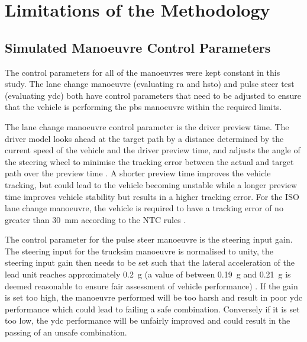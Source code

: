 \section{Limitations of the Methodology}\label{section:discussion-methodology-limitations}

\subsection{Simulated Manoeuvre Control Parameters}\label{section:discussion-limitations-control-parameters}

The control parameters for all of the manoeuvres were kept constant in this study. The lane change manoeuvre (evaluating \gls{ra} and \gls{hsto}) and pulse steer test (evaluating \gls{ydc}) both have control parameters that need to be adjusted to ensure that the vehicle is performing the \gls{pbs} manoeuvre within the required limits.

The lane change manoeuvre control parameter is the driver preview time. The driver model looks ahead at the target path by a distance determined by the current speed of the vehicle and the driver preview time, and adjusts the angle of the steering wheel to minimise the tracking error between the actual and target path over the preview time \cite{MechanicalSimulationHelpFileDriverControls2017}. A shorter preview time improves the vehicle tracking, but could lead to the vehicle becoming unstable while a longer preview time improves vehicle stability but results in a higher tracking error. For the ISO lane change manoeuvre, the vehicle is required to have a tracking error of no greater than 30~mm according to the NTC rules \cite{NationalTransportCommission2008}.

The control parameter for the pulse steer manoeuvre is the steering input gain. The steering input for the \gls{trucksim} manoeuvre is normalised to unity, the steering input gain then needs to be set such that the lateral acceleration of the lead unit reaches approximately 0.2~g (a value of between 0.19~g and 0.21~g is deemed reasonable to ensure fair assessment of vehicle performance) \cite{MechanicalSimulationTechMemoPBS2017}. If the gain is set too high, the manoeuvre performed will be too harsh and result in poor \gls{ydc} performance which could lead to failing a safe combination. Conversely if it is set too low, the \gls{ydc} performance will be unfairly improved and could result in the passing of an unsafe combination.

